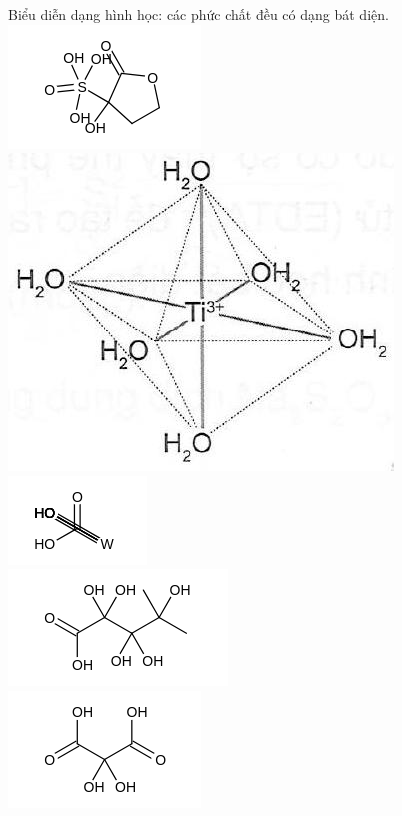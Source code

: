 \documentclass[10pt]{article}
\begin{document}
Biểu diễn dạng hình học: các phức chất đều có dạng bát diện.\\
\includegraphics{smile-372fe1cfe34d73e25ed8ebc255fb7f3d33e46466}\\
\includegraphics[max width=\textwidth, center]{2025_10_23_b4e16b74380d0f7e7700g-121(1)}\\
\includegraphics{smile-e78c15cb3f2e0b6f4c90e0e4fbaac8a2e9afbd12}\\
\includegraphics{smile-680e25fac8159c76f57f91659a96b1d26accee6f}\\
\includegraphics{smile-0924940e3ff80327c10488fd6df61d4915b8b379}\\
\end{document}
